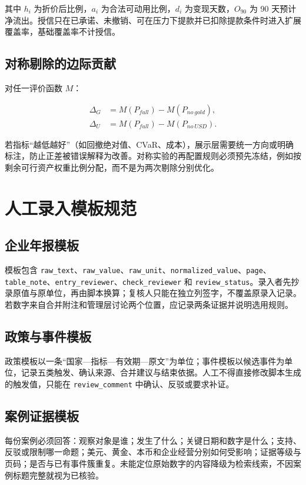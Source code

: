 \documentclass[UTF8,fontset=windows,12pt,openany]{ctexbook}
\newcommand{\Field}[1]{{\small\nolinkurl{#1}}}
\begin{document}
其中 \(h_i\) 为折价后比例，\(a_i\) 为合法可动用比例，\(d_i\) 为变现天数，\(O_{90}\) 为 90 天预计净流出。授信只在已承诺、未撤销、可在压力下提款并已扣除提款条件时进入扩展覆盖率，基础覆盖率不计授信。

\section{对称剔除的边际贡献}

对任一评价函数 \(M\)：

\begin{align}
\Delta_G &= M(P_{full})-M(P_{no\ gold}),\\
\Delta_U &= M(P_{full})-M(P_{no\ USD}).
\end{align}

若指标“越低越好”（如回撤绝对值、CVaR、成本），展示层需要统一方向或明确标注，防止正差被错误解释为改善。对称实验的再配置规则必须预先冻结，例如按剩余可行资产权重比例分配，而不是为两次剔除分别优化。

\chapter{人工录入模板规范}

\section{企业年报模板}

模板包含 \Field{raw_text}、\Field{raw_value}、\Field{raw_unit}、\Field{normalized_value}、\Field{page}、\Field{table_note}、\Field{entry_reviewer}、\Field{check_reviewer} 和 \Field{review_status}。录入者先抄录原值与原单位，再由脚本换算；复核人只能在独立列签字，不覆盖原录入记录。若数字来自合并附注和管理层讨论两个位置，应记录两条证据并说明选用规则。

\section{政策与事件模板}

政策模板以一条“国家—指标—有效期—原文”为单位；事件模板以候选事件为单位，记录五类触发、确认来源、合并建议与结束依据。人工不得直接修改脚本生成的触发值，只能在 \Field{review_comment} 中确认、反驳或要求补证。

\section{案例证据模板}

每份案例必须回答：观察对象是谁；发生了什么；关键日期和数字是什么；支持、反驳或限制哪一命题；美元、黄金、本币和企业经营分别如何受影响；证据等级与页码；是否与已有事件簇重复。未能定位原始数字的内容降级为检索线索，不因案例标题完整就视为已核验。
\end{document}
